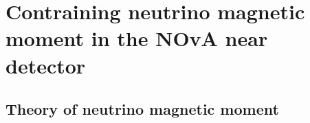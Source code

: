 \chapter{Contraining neutrino magnetic moment in the NOvA near detector}\label{sec:NeutrinoMagMoment}


\section{Theory of neutrino magnetic moment}






